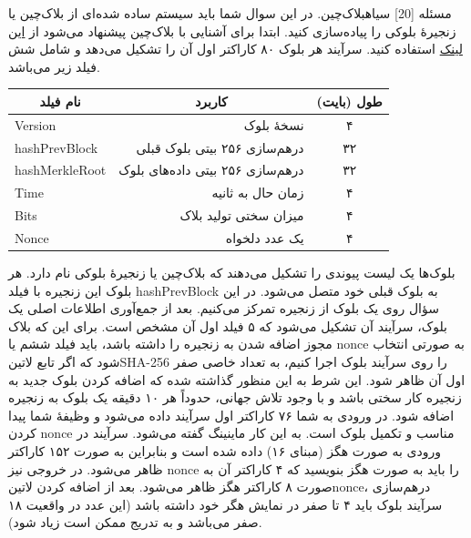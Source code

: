 ‌مسئله [20]
‌سیاه{بلاک‌چین.}
در این سوال شما باید سیستم ساده شده‌ای از بلاک‌چین یا زنجیرهٔ بلوکی را پیاده‌سازی کنید. ابتدا برای آشنایی با بلاک‌چین پیشنهاد می‌شود از 
\href{https://blog.goodaudience.com/blockchain-for-beginners-what-is-blockchain-519db8c6677a}{این لینک}
 استفاده کنید. 
 سرآیند هر بلوک ۸۰ کاراکتر اول آن را تشکیل می‌دهد و شامل شش فیلد زیر می‌باشد.
\begin{center}
	\begin{tabular}{|l|r|c|}
		\hline
		\multicolumn{1}{|c|}{نام فیلد}
		            & \multicolumn{1}{c|}{کاربرد}               
		            	          & 
		            	          طول (بایت) 
		            	          \\		\hline		\hline
		Version        & نسخهٔ بلوک                        & ۴          \\		\hline
		hashPrevBlock  & درهم‌سازی ۲۵۶ بیتی بلوک قبلی     & ۳۲         \\		\hline
		hashMerkleRoot & درهم‌سازی ۲۵۶ بیتی داده‌های بلوک & ۳۲         \\		\hline
		Time           & زمان حال به ثانیه                & ۴          \\		\hline
		Bits           & میزان سختی تولید بلاک            & ۴          \\		\hline
		Nonce          & یک عدد دلخواه                    & ۴         
\\		\hline
	\end{tabular}
\end{center}
بلوک‌ها یک لیست پیوندی را تشکیل می‌دهند که بلاک‌چین یا زنجیرهٔ بلوکی نام دارد. هر بلوک این زنجیره با فیلد hashPrevBlock به بلوک قبلی خود متصل می‌شود. در این سؤال روی یک بلوک از زنجیره تمرکز می‌کنیم. بعد از جمع‌آوری اطلاعات اصلی یک بلوک، سرآیند آن تشکیل می‌شود که ۵ فیلد اول آن مشخص است. برای این که بلاک مجوز اضافه شدن به زنجیره را داشته باشد، باید فیلد ششم یا nonce به صورتی انتخاب شود که اگر تابع ‌لاتین{SHA-256} را  روی سرآیند بلوک اجرا کنیم، به تعداد خاصی صفر اول آن ظاهر شود. این شرط به این منظور گذاشته شده که اضافه کردن بلوک جدید به زنجیره کار سختی باشد و با وجود تلاش جهانی، حدوداً هر ۱۰ دقیقه یک بلوک به زنجیره اضافه شود.
در ورودی به شما ۷۶ کاراکتر اول سرآیند داده می‌شود و وظیفۀ شما پیدا کردن nonce مناسب و تکمیل بلوک است.  به این کار ماینینگ گفته می‌شود. سرآیند در ورودی به صورت هگز (مبنای ۱۶) داده شده است و بنابراین به صورت ۱۵۲ کاراکتر ظاهر می‌شود. در خروجی نیز nonce را باید به صورت هگز بنویسید که ۴ کاراکتر آن به صورت ۸ کاراکتر هگز ظاهر می‌شود. بعد از اضافه کردن ‌لاتین{nonce}، درهم‌سازی سرآیند بلوک باید ۴ تا صفر در نمایش هگر خود داشته باشد (این عدد در واقعیت ۱۸ صفر می‌باشد و به تدریج ممکن است زیاد شود).

